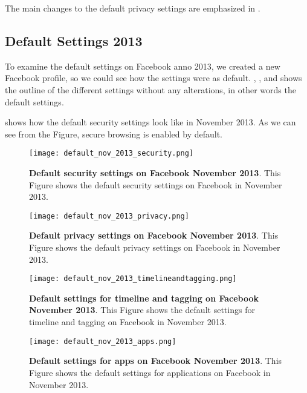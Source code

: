 
The main changes to the default privacy settings are emphasized in . 


\subsection{Default Settings 2013}

To examine the default settings on Facebook anno 2013, we created a new Facebook profile, so we could see how the settings were as default. , ,  and  shows the outline of the different settings without any alterations, in other words the default settings. 

 shows how the default security settings look like in November 2013. As we can see from the Figure, secure browsing is enabled by default. 

\begin{figure}[h!]
\centering
\texttt{[image: default\_nov\_2013\_security.png]}
\caption[Default security settings on Facebook November 2013]{\textbf{Default security settings on Facebook November 2013}. This Figure shows the default security settings on Facebook in November 2013.} 
\label{fig:security2013}
\end{figure}

\begin{figure}[h!]
\centering
\texttt{[image: default\_nov\_2013\_privacy.png]}
\caption[Default privacy settings on Facebook November 2013]{\textbf{Default privacy settings on Facebook November 2013}. This Figure shows the default privacy settings on Facebook in November 2013.} 
\label{fig:privacy2013}
\end{figure}

\begin{figure}[h!]
\centering
\texttt{[image: default\_nov\_2013\_timelineandtagging.png]}
\caption[Default settings for timeline and tagging on Facebook November 2013]{\textbf{Default settings for timeline and tagging on Facebook November 2013}. This Figure shows the default settings for timeline and tagging on Facebook in November 2013.} 
\label{fig:timelineandtagging2013}
\end{figure}

\begin{figure}[h!]
\centering
\texttt{[image: default\_nov\_2013\_apps.png]}
\caption[Default settings for apps on Facebook November 2013]{\textbf{Default  settings for apps on Facebook November 2013}. This Figure shows the default settings for applications on Facebook in November 2013.} 
\label{fig:apps2013}
\end{figure}

